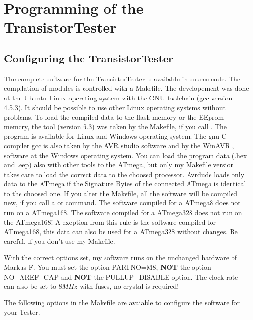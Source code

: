 \chapter{Programming of the TransistorTester}
\section{Configuring the TransistorTester}
\label{sec:config}
The complete software for the TransistorTester is available in source code.
The compilation of modules is controlled with a Makefile. The developement was done
at the Ubuntu Linux operating system with the GNU toolchain (gcc version 4.5.3).
It should be possible to use other Linux operating systems without problems.
To load the compiled data to the flash memory or
the EEprom memory, the tool  (version 6.3) was taken by the Makefile, if you call .
The program  \cite{avrdude} is available for Linux and Windows operating system.
The gnu C-compiler gcc is also taken by the AVR studio software and
by the WinAVR \cite{winavr1},\cite{winavr2} software at the Windows operating system.
You can load the program data (.hex and .eep) also with other tools to the ATmega,
but only my Makefile version takes care to load the correct data to the choosed processor.
Avrdude loads only data to the ATmega if the Signature Bytes of the connected ATmega is
identical to the choosed one. 
If you alter the Makefile, all the software will be compiled new, if you call a  or
 command. The software compiled for a ATmega8 does not run on a ATmega168.
The software compiled for a ATmega328 does not run on the ATmega168! 
A exeption from this rule is the software compiled for ATmega168, this data can also be used
for a ATmega328 without changes.
Be careful, if you don't use my Makefile.

With the correct options set, my software runs on the unchanged hardware of Markus F.
You must set the option PARTNO=M8, \textbf{NOT} the option NO\_AREF\_CAP and \textbf{NOT} the PULLUP\_DISABLE option.
The clock rate can also be set to \(8MHz\) with fuses, no crystal is required!


The following options in the Makefile are avaiable to configure the software for your Tester.


